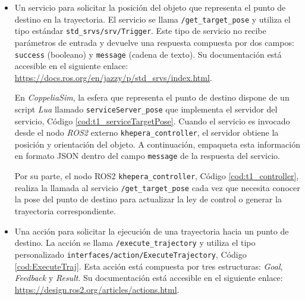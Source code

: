 \begin{itemize}
    \begin{equation}
        v = \frac{r}{2}(\omega_R + \omega_L)
        \qquad
        \omega = \frac{r}{L}(\omega_R - \omega_L)
        \label{eq:2}
    \end{equation}

    \begin{equation}
        v = \frac{v_L + v_R}{2}
        \qquad
        \omega = \frac{v_R - v_L}{L/2}
        \label{eq:3}
    \end{equation}

    Finalmente, despejando las velocidades angulares de cada rueda se obtiene la expresión
    necesaria para calcularlas, Ecuaciones 4.
    \begin{equation}
        \omega_L = \frac{v - \omega \frac{L}{2}}{r}
        \qquad
        \omega_R = \frac{v + \omega \frac{L}{2}}{r}
    \end{equation}


    \item Un servicio para solicitar la posición del objeto que representa 
    el punto de destino en la trayectoria. El servicio se llama 
    \texttt{/get\_target\_pose} y utiliza el tipo estándar 
    \texttt{std\_srvs/srv/Trigger}. Este tipo de servicio no recibe parámetros 
    de entrada y devuelve una respuesta compuesta por dos campos: 
    \texttt{success} (booleano) y \texttt{message} (cadena de texto). Su documentación 
    está accesible en el siguiente enlace:
    \url{https://docs.ros.org/en/jazzy/p/std_srvs/index.html}.

    En \textit{CoppeliaSim}, la esfera que representa el punto de destino 
    dispone de un script \textit{Lua} llamado 
    \texttt{serviceServer\_pose} que implementa el servidor del servicio, 
    Código \ref{cod:t1_serviceTargetPose}. Cuando el servicio es invocado desde 
    el nodo \textit{ROS2} externo \texttt{khepera\_controller}, el servidor obtiene la posición y
    orientación del objeto. A continuación, empaqueta esta información en formato
    JSON dentro del campo \texttt{message} de la respuesta del servicio.

    Por su parte, el nodo ROS2 \texttt{khepera\_controller}, 
    Código \ref{cod:t1_controller}, realiza la llamada al servicio 
    \texttt{/get\_target\_pose} cada vez que necesita conocer la pose del punto 
    de destino para actualizar la ley de control o generar la trayectoria 
    correspondiente.

    \item Una acción para solicitar la ejecución de una trayectoria hacia un punto 
    de destino. La acción se llama \texttt{/execute\_trajectory} y utiliza el tipo 
    personalizado \texttt{interfaces/action/ExecuteTrajectory}, Código \ref{cod:ExecuteTraj}. 
    Esta acción está compuesta 
    por tres estructuras: \textit{Goal}, \textit{Feedback} y \textit{Result}. Su 
    documentación está accesible en el siguiente enlace:
    \url{https://design.ros2.org/articles/actions.html}.


\end{itemize}
